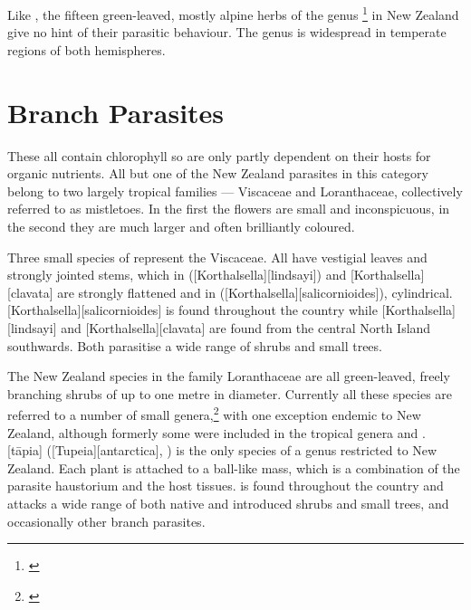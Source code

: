Like , the fifteen green-leaved, mostly alpine herbs of the genus \footnote{\cite{philipson1959some}} in New Zealand give no hint of their parasitic behaviour.
The genus is widespread in temperate regions of both hemispheres.

\section{Branch Parasites}

These all contain chlorophyll so are only partly dependent on their hosts for organic nutrients.
All but one of the New Zealand parasites in this category belong to two largely tropical families --- Viscaceae and Loranthaceae, collectively referred to as mistletoes.
In the first the flowers are small and inconspicuous, in the second they are much larger and often brilliantly coloured.

Three small species of  represent the Viscaceae.
All have vestigial leaves and strongly jointed stems, which in  ([Korthalsella][lindsayi]) and [Korthalsella][clavata] are strongly flattened and in  ([Korthalsella][salicornioides]), cylindrical. [Korthalsella][salicornioides] is found throughout the country while [Korthalsella][lindsayi] and [Korthalsella][clavata] are found from the central North Island southwards.
Both parasitise a wide range of shrubs and small trees.

The New Zealand species in the family Loranthaceae are all green-leaved, freely branching shrubs of up to one metre in diameter.
Currently all these species are referred to a number of small genera,\footnote{\cite{barlow1966revision}} with one exception endemic to New Zealand, although formerly some were included in the tropical genera  and .
[tāpia] ([Tupeia][antarctica], ) is the only species of a genus restricted to New Zealand.
Each plant is attached to a ball-like mass, which is a combination of the parasite haustorium and the host tissues.  is found throughout the country and attacks a wide range of both native and introduced shrubs and small trees, and occasionally other branch parasites.

